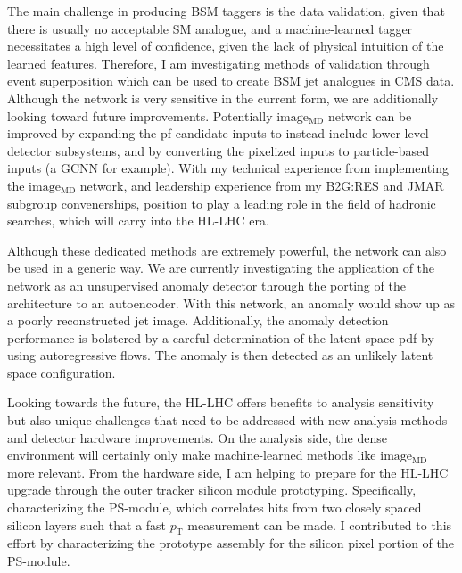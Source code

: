 \documentclass[12pt]{article}
\begin{document}
The main challenge in producing BSM taggers is the data validation, given that there
is usually no acceptable SM analogue, and a machine-learned tagger necessitates a
high level of confidence, given the lack of physical intuition of the learned features.
Therefore, I am investigating methods of validation through event superposition
which can be used to create BSM jet analogues in CMS data.  Although the network is
very sensitive in the current form, we are additionally looking toward future improvements.
Potentially $\mathrm{image_{MD}}$ network can be improved by expanding the pf candidate inputs to
instead include lower-level detector subsystems, and by converting the pixelized inputs
to particle-based inputs (a GCNN for example).  With my technical experience from implementing the
$\mathrm{image_{MD}}$ network, and leadership experience from my
B2G:RES and JMAR subgroup convenerships, position to play a leading role in the
field of hadronic searches, which will carry into the HL-LHC era.

Although these dedicated methods are
extremely powerful, the network can also be used in a generic way.
We are currently investigating the application of the network as an unsupervised
anomaly detector through the porting of the architecture to an autoencoder.
With this network, an anomaly would show up as a poorly reconstructed jet image.
Additionally, the anomaly detection performance is bolstered by a careful determination of the latent space pdf by using autoregressive flows.
The anomaly is then detected as an unlikely latent space configuration.

Looking towards the future, the HL-LHC offers benefits to analysis sensitivity
but also unique challenges that need to be addressed with new analysis methods
and detector hardware improvements.  On the analysis side, the dense environment
will certainly only make machine-learned methods like $\mathrm{image_{MD}}$ more
relevant.  From the hardware side, I am helping to prepare for the HL-LHC
upgrade through the outer tracker silicon module prototyping.
Specifically, characterizing the PS-module, which correlates hits from two closely
spaced silicon layers such that a fast $p_\mathrm{T}$ measurement can be made.  I contributed to
this effort by characterizing the prototype assembly for the silicon pixel portion
of the PS-module.
\end{document}
